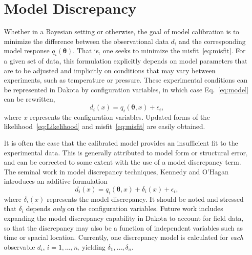 \section{Model Discrepancy}

Whether in a Bayesian setting or otherwise, the goal of model calibration
is to minimize the difference between the observational data $d_i$ and 
the corresponding model response $q_i(\boldsymbol{\theta})$. That is, one seeks
to minimize the misfit~\ref{eq:misfit}. For a given set of data, this 
formulation explicitly depends on model parameters that are to be adjusted and
implicitly on conditions that may vary between experiments, such as temperature
or pressure. These experimental conditions can be represented in Dakota by
configuration variables, in which case Eq.~\ref{eq:model} can be rewritten,
\begin{equation}
d_i(x) = q_i(\boldsymbol{\theta}, x) + \epsilon_i, 
\end{equation} 
where $x$ represents the configuration variables. Updated forms of the 
likelihood~\ref{eq:Likelihood} and misfit~\ref{eq:misfit} are easily obtained.

It is often the case that the calibrated model provides an insufficient fit to
the experimental data. This is generally attributed to model form or 
structural error, and can be corrected to some extent with the use of a model 
discrepancy term. The seminal work in model discrepancy techniques, Kennedy and 
O'Hagan~\cite{Kenn01} introduces an additive formulation 
\begin{equation}
d_i(x) = q_i\left(\boldsymbol{\theta}, x\right) + \delta_i(x) + \epsilon_i,
\end{equation} 
where $\delta_i(x)$ represents the model discrepancy. It should be noted and
stressed that $\delta_i$ depends \textit{only} on the configuration variables.
Future work includes expanding the model discrepancy capability in Dakota to
account for field data, so that the discrepancy may also be a function of
independent variables such as time or spacial location. Currently, one
discrepancy model is calculated for \textit{each} observable $d_i$, $i = 1, 
\ldots, n$, yielding $\delta_1, \ldots, \delta_n$.

